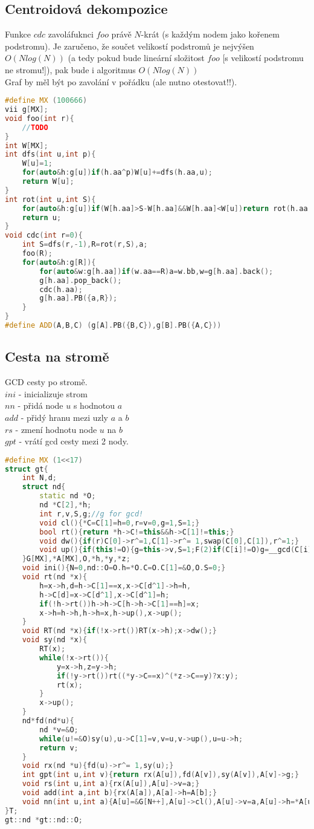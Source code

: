 \documentclass[11pt]{article}
\begin{document}
\subsection{Centroidová dekompozice}
Funkce $cdc$ zavoláfuknci $foo$ právě $N$-krát (s každým nodem jako kořenem podstromu). Je zaručeno, že součet velikostí podstromů je nejvýšen $O(Nlog(N))$ (a tedy pokud bude lineární složitost $foo$ [s velikostí podstromu {ne stromu!}]), pak bude i algoritmus $O(Nlog(N))$
\\Graf by měl být po zavolání v pořádku (ale nutno otestovat!!).
\begin{lstlisting}[language=C++]
#define MX (100666)
vii g[MX];
void foo(int r){
    //TODO
}
int W[MX];
int dfs(int u,int p){
    W[u]=1;
    for(auto&h:g[u])if(h.aa^p)W[u]+=dfs(h.aa,u);
    return W[u];
}
int rot(int u,int S){
    for(auto&h:g[u])if(W[h.aa]>S-W[h.aa]&&W[h.aa]<W[u])return rot(h.aa,S);
    return u;
}
void cdc(int r=0){
    int S=dfs(r,-1),R=rot(r,S),a;
    foo(R);
    for(auto&h:g[R]){
        for(auto&w:g[h.aa])if(w.aa==R)a=w.bb,w=g[h.aa].back();
        g[h.aa].pop_back();
        cdc(h.aa);
        g[h.aa].PB({a,R});
    }
}
#define ADD(A,B,C) (g[A].PB({B,C}),g[B].PB({A,C}))
\end{lstlisting}
\subsection{Cesta na stromě}
GCD cesty po stromě.
\\$ini$ - inicializuje strom
\\$nn$ - přidá node $u$ s hodnotou $a$
\\$add$ - přidý hranu mezi uzly $a$ a $b$
\\$rs$ - zmení hodnotu node $u$ na $b$
\\$gpt$ - vrátí gcd cesty mezi 2 nody.
\begin{lstlisting}[language=C++]
#define MX (1<<17)
struct gt{
    int N,d;
    struct nd{
        static nd *O;
        nd *C[2],*h;
        int r,v,S,g;//g for gcd!
        void cl(){*C=C[1]=h=0,r=v=0,g=1,S=1;}
        bool rt(){return *h->C!=this&&h->C[1]!=this;}
        void dw(){if(r)C[0]->r^=1,C[1]->r^= 1,swap(C[0],C[1]),r^=1;}
        void up(){if(this!=O){g=this->v,S=1;F(2)if(C[i]!=O)g=__gcd(C[i]->g,g),S+=C[i]->S;}}
    }G[MX],*A[MX],O,*h,*y,*z;
    void ini(){N=0,nd::O=O.h=*O.C=O.C[1]=&O,O.S=0;}
    void rt(nd *x){
        h=x->h,d=h->C[1]==x,x->C[d^1]->h=h,
        h->C[d]=x->C[d^1],x->C[d^1]=h;
        if(!h->rt())h->h->C[h->h->C[1]==h]=x;
        x->h=h->h,h->h=x,h->up(),x->up();
    }
    void RT(nd *x){if(!x->rt())RT(x->h);x->dw();}
    void sy(nd *x){
        RT(x);
        while(!x->rt()){
            y=x->h,z=y->h;
            if(!y->rt())rt((*y->C==x)^(*z->C==y)?x:y);
            rt(x);
        }
        x->up();
    }
    nd*fd(nd*u){
        nd *v=&O;
        while(u!=&O)sy(u),u->C[1]=v,v=u,v->up(),u=u->h;
        return v;
    }
    void rx(nd *u){fd(u)->r^= 1,sy(u);}
    int gpt(int u,int v){return rx(A[u]),fd(A[v]),sy(A[v]),A[v]->g;}
    void rs(int u,int a){rx(A[u]),A[u]->v=a;}
    void add(int a,int b){rx(A[a]),A[a]->h=A[b];}
    void nn(int u,int a){A[u]=&G[N++],A[u]->cl(),A[u]->v=a,A[u]->h=*A[u]->C=A[u]->C[1]=&O;}
}T;
gt::nd *gt::nd::O;
\end{lstlisting}
\end{document}

